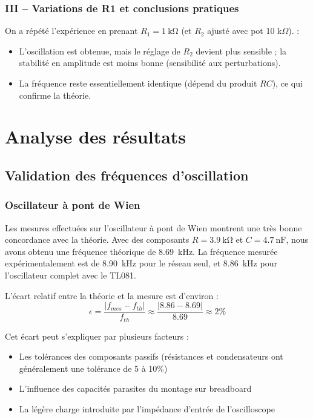 \documentclass[11pt,a4paper]{report}
\begin{document}
\subsection{III -- Variations de R1 et conclusions pratiques}
On a répété l'expérience en prenant \(R_1=\SI{1}{\kilo\ohm}\) (et \(R_2\) ajusté avec pot 10 k\(\Omega\)). :
\begin{itemize}
    \item L'oscillation est obtenue, mais le réglage de \(R_2\) devient plus sensible ; la stabilité en amplitude est moins bonne (sensibilité aux perturbations).
    \item La fréquence reste essentiellement identique (dépend du produit \(RC\)), ce qui confirme la théorie.
\end{itemize}

\clearpage

\chapter{Analyse des résultats}

\section{Validation des fréquences d'oscillation}

\subsection{Oscillateur à pont de Wien}

Les mesures effectuées sur l'oscillateur à pont de Wien montrent une très bonne concordance avec la théorie. Avec des composants \(R = \SI{3.9}{\kilo\ohm}\) et \(C = \SI{4.7}{\nano\farad}\), nous avons obtenu une fréquence théorique de \SI{8.69}{\kilo\hertz}. La fréquence mesurée expérimentalement est de \SI{8.90}{\kilo\hertz} pour le réseau seul, et \SI{8.86}{\kilo\hertz} pour l'oscillateur complet avec le TL081.

L'écart relatif entre la théorie et la mesure est d'environ :
\[
\epsilon = \frac{|f_{mes} - f_{th}|}{f_{th}} \approx \frac{|8.86 - 8.69|}{8.69} \approx 2\%
\]

Cet écart peut s'expliquer par plusieurs facteurs :
\begin{itemize}
    \item Les tolérances des composants passifs (résistances et condensateurs ont généralement une tolérance de 5 à 10\%)
    \item L'influence des capacités parasites du montage sur breadboard
    \item La légère charge introduite par l'impédance d'entrée de l'oscilloscope
\end{itemize}
\end{document}

